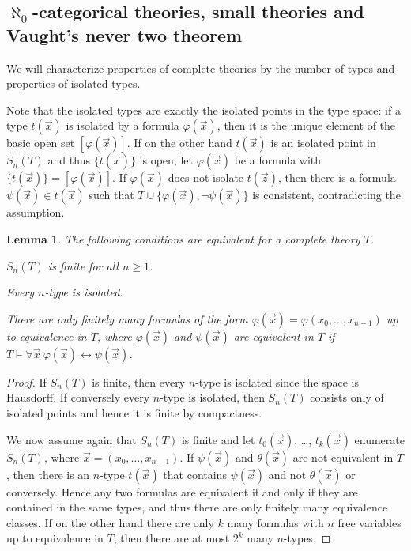 \documentclass[10pt]{amsart}
\newtheorem{lemma}[theorem]{Lemma}
\theoremstyle{definition}
\theoremstyle{remark}
\newenvironment{enumerate-(a)}{\begin{enumerate}[label={\upshape (\alph*)}, leftmargin=2pc]}{\end{enumerate}}
\begin{document}
\subsection{$\aleph_0$-categorical theories, small theories and Vaught's never two theorem} \label{section: ryll-nardzewski} 

We will characterize properties of complete theories by the number of types and properties of isolated types. 

Note that the isolated types are exactly the isolated points in the type space: if a type $t(\vec{x})$ is isolated by a formula $\varphi(\vec{x})$, then it is the unique element of the basic open set $[\varphi(\vec{x})]$. 
If on the other hand $t(\vec{x})$ is an isolated point in $S_n(T)$ and thus $\{t(\vec{x})\}$ is open, let $\varphi(\vec{x})$ be a formula with $\{t(\vec{x})\}=[\varphi(\vec{x})]$. If $\varphi(\vec{x})$ does not isolate $t(\vec{z})$, then there is a formula $\psi(\vec{x})\in t(\vec{x})$ such that $T\cup\{\varphi(\vec{x}),\neg\psi(\vec{x})\}$ is consistent, contradicting the assumption. 


\begin{lemma} \label{characterization of finite type spaces} 
The following conditions are equivalent for a complete theory $T$. 
\begin{enumerate-(a)} 
\item 
$S_n(T)$ is finite for all $n\geq 1$. 
\item 
Every $n$-type is isolated. 
\item 
There are only finitely many formulas of the form $\varphi(\vec{x})=\varphi(x_0,\dots,x_{n-1})$ up to equivalence in $T$, where $\varphi(\vec{x})$ and $\psi(\vec{x})$ are equivalent in $T$ if $T\models \forall \vec{x}\ \varphi(\vec{x})\leftrightarrow \psi(\vec{x})$. 
\end{enumerate-(a)} 
\end{lemma} 
\begin{proof} 
If $S_n(T)$ is finite, then every $n$-type is isolated since the space is Hausdorff. 
If conversely every $n$-type is isolated, then $S_n(T)$ consists only of isolated points and hence it is finite by compactness. 

We now assume again that $S_n(T)$ is finite and let $t_0(\vec{x})$, \dots, $t_k(\vec{x})$ enumerate $S_n(T)$, where $\vec{x}=(x_0,\dots,x_{n-1})$. If $\psi(\vec{x})$ and $\theta(\vec{x})$ are not equivalent in $T$, then there is an $n$-type $t(\vec{x})$ that contains $\psi(\vec{x})$ and not $\theta(\vec{x})$ or conversely. Hence any two formulas are equivalent if and only if they are contained in the same types, and thus there are only finitely many equivalence classes. 
If on the other hand there are only $k$ many formulas with $n$ free variables up to equivalence in $T$, then there are at most $2^k$ many $n$-types. 
\end{proof} 
\end{document}
